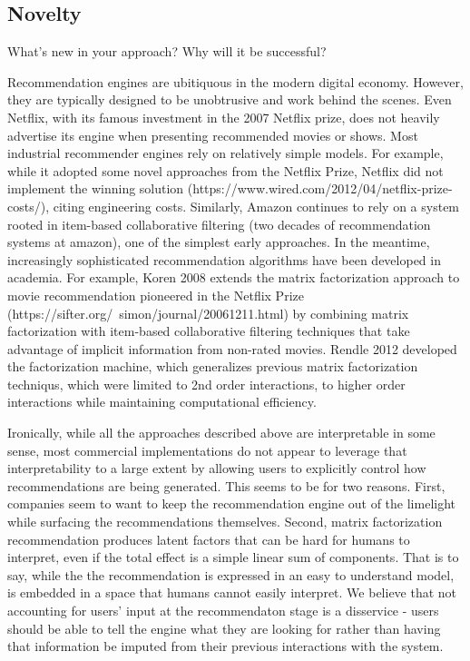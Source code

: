 \subsection{Novelty}
What's new in your approach? Why will it be successful?

Recommendation engines are ubitiquous in the modern digital economy. However, they are typically designed to be unobtrusive and work behind the scenes. Even Netflix, with its famous investment in the 2007 Netflix prize, does not heavily advertise its engine when presenting recommended movies or shows. Most industrial recommender engines rely on relatively simple models. For example, while it adopted some novel approaches from the Netflix Prize, Netflix did not implement the winning solution (https://www.wired.com/2012/04/netflix-prize-costs/), citing engineering costs. Similarly, Amazon continues to rely on a system rooted in item-based collaborative filtering (two decades of recommendation systems at amazon), one of the simplest early approaches. In the meantime, increasingly sophisticated recommendation algorithms have been developed in academia. For example, Koren 2008 extends the matrix factorization approach to movie recommendation pioneered in the Netflix Prize (https://sifter.org/~simon/journal/20061211.html) by combining matrix factorization with item-based collaborative filtering techniques that take advantage of implicit information from non-rated movies. Rendle 2012 developed the factorization machine, which generalizes previous matrix factorization techniqus, which were limited to 2nd order interactions, to higher order interactions while maintaining computational efficiency. 

Ironically, while all the approaches described above are interpretable in some sense, most commercial implementations do not appear to leverage that interpretability to a large extent by allowing users to explicitly control how recommendations are being generated. This seems to be for two reasons. First, companies seem to want to keep the recommendation engine out of the limelight while surfacing the recommendations themselves. Second, matrix factorization recommendation produces latent factors that can be hard for humans to interpret, even if the total effect is a simple linear sum of components. That is to say, while the the recommendation is expressed in an easy to understand model, is embedded in a space that humans cannot easily interpret. We believe that not accounting for users' input at the recommendaton stage is a disservice - users should be able to tell the engine what they are looking for rather than having that information be imputed from their previous interactions with the system. 

